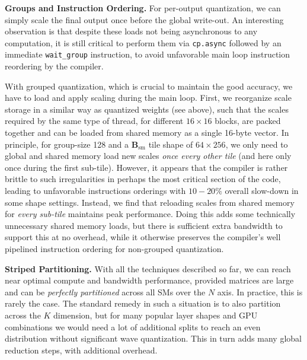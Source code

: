 \documentclass{article}
\theoremstyle{plain}
\theoremstyle{definition}
\theoremstyle{remark}
\newcommand{\code}[1]{\texttt{\small{#1}}}
\renewcommand{\paragraph}[1]{\vspace{0.1em}\noindent\textbf{#1}}
\begin{document}
\paragraph{Groups and Instruction Ordering.}
For per-output quantization, we can simply scale the final output once before the global write-out. An interesting observation is that despite these loads not being asynchronous to any computation, it is still critical to perform them via \code{cp.async} followed by an immediate \code{wait\_group} instruction, to avoid unfavorable main loop instruction reordering by the compiler.

With grouped quantization, which is crucial to maintain the good accuracy, we have to load and apply scaling during the main loop. First, we reorganize scale storage in a similar way as quantized weights (see above), such that the scales required by the same type of thread, for different $16 \times 16$ blocks, are packed together and can be loaded from shared memory as a single 16-byte vector. In principle, for group-size 128 and a $\mathbf{B}_\text{sm}$ tile shape of $64 \times 256$, we only need to global and shared memory load new scales \emph{once every other tile} (and here only once during the first sub-tile). However, it appears that the compiler is rather brittle to such irregularities in perhaps the most critical section of the code, leading to unfavorable instructions orderings with $10 - 20\%$ overall slow-down in some shape settings. Instead, we find that reloading scales from shared memory for \emph{every sub-tile} maintains peak performance. Doing this adds some technically unnecessary shared memory loads, but there is sufficient extra bandwidth to support this at no overhead, while it otherwise preserves the compiler's well pipelined instruction ordering for non-grouped quantization.

\paragraph{Striped Partitioning.}
With all the techniques described so far, we can reach near optimal compute and bandwidth performance, provided matrices are large and can be \emph{perfectly partitioned} across all SMs over the $N$ axis. In practice, this is rarely the case. The standard remedy in such a situation is to also partition across the $K$ dimension, but for many popular layer shapes and GPU combinations we would need a lot of additional splits to reach an even distribution without significant wave quantization. This in turn adds many global reduction steps, with additional overhead.
\end{document}
